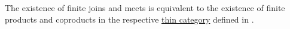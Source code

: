 \begin{remark}\label{rem:lattice_categorical_product}
  The existence of finite joins and meets is equivalent to the existence of finite products and coproducts in the respective \hyperref[def:thin_category]{thin category} defined in .
\end{remark}
